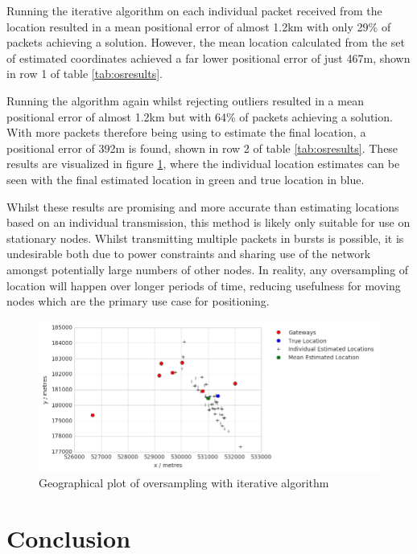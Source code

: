 \documentclass[a4paper]{report}
\begin{document}
    Running the iterative algorithm on each individual packet received from the location resulted in a mean positional error of almost 1.2km with only 29\% of packets achieving a solution. However, the mean location calculated from the set of estimated coordinates achieved a far lower positional error of just 467m, shown in row 1 of table \ref{tab:osresults}.

    Running the algorithm again whilst rejecting outliers resulted in a mean positional error of almost 1.2km but with 64\% of packets achieving a solution. With more packets therefore being using to estimate the final location, a positional error of 392m is found, shown in row 2 of table \ref{tab:osresults}. These results are visualized in figure \ref{fig:oversampleplot}, where the individual location estimates can be seen with the final estimated location in green and true location in blue.

    Whilst these results are promising and more accurate than estimating locations based on an individual transmission, this method is likely only suitable for use on stationary nodes. Whilst transmitting multiple packets in bursts is possible, it is undesirable both due to power constraints and sharing use of the network amongst potentially large numbers of other nodes. In reality, any oversampling of location will happen over longer periods of time, reducing usefulness for moving nodes which are the primary use case for positioning.

    \begin{figure}[ht]
    \centering
    \includegraphics[width=16cm]{figures/oversampleplot.png}
    \caption{Geographical plot of oversampling with iterative algorithm}
    \label{fig:oversampleplot}
    \end{figure}





\chapter{Conclusion}
\end{document}
